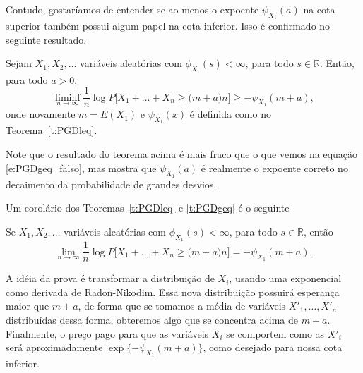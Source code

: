 Contudo, gostaríamos de entender se ao menos o expoente $\psi_{X_1}(a)$ na cota superior também possui algum papel na cota inferior.
Isso é confirmado no seguinte resultado.

\begin{theorem}
  \label{t:PGDgeq}
  Sejam $X_1, X_2, \dots$ variáveis aleatórias \iid com $\phi_{X_1}(s) < \infty$, para todo $s \in \mathbb{R}$.
  Então, para todo $a > 0$,
  \begin{equation}
    \liminf_{n \to \infty} \frac{1}{n} \log P\big[ X_1 + \dots + X_n \geq \big(m + a \big) n \big] \geq -\psi_{X_1}(m + a),
  \end{equation}
  onde novamente $m = E(X_1)$ e $\psi_{X_1}(x)$ é definida como no Teorema~\ref{t:PGDleq}.
\end{theorem}

Note que o resultado do teorema acima é mais fraco que o que vemos na equação \eqref{e:PGDgeq_falso}, mas mostra que $\psi_{X_1}(a)$ é realmente o expoente correto no decaimento da probabilidade de grandes desvios.

Um corolário dos Teoremas~\ref{t:PGDleq} e \ref{t:PGDgeq} é o seguinte

\begin{corollary}
  Se $X_1, X_2, \dots$ variáveis aleatórias \iid com $\phi_{X_1}(s) < \infty$, para todo $s \in \mathbb{R}$, então
  \begin{equation}
    \lim_{n \to \infty} \frac{1}{n} \log P\big[ X_1 + \dots + X_n \geq \big(m + a \big) n \big] = -\psi_{X_1}(m + a).
  \end{equation}
\end{corollary}

A idéia da prova é transformar a distribuição de $X_i$, usando uma exponencial como derivada de Radon-Nikodim.
Essa nova distribuição possuirá esperança maior que $m + a$, de forma que se tomamos a média de variáveis \iid $X'_1, \dots, X'_n$ distribuídas dessa forma, obteremos algo que se concentra acima de $m + a$.
Finalmente, o preço pago para que as variáveis $X_i$ se comportem como as $X'_i$ será aproximadamente $\exp\{-\psi_{X_1}(m + a)\}$, como desejado para nossa cota inferior.

